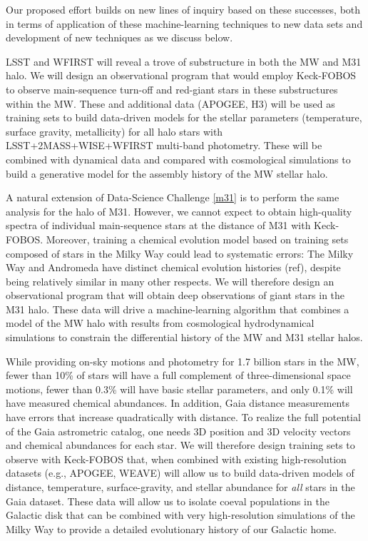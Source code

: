 \documentclass[oneside,11pt]{amsart}
\newcounter{chalno}
\newcommand{\chal}[1]{\refstepcounter{chalno}\label{#1}}
\begin{document}
Our proposed effort builds on new lines of inquiry based on these
successes, both in terms of application of these machine-learning
techniques to new data sets and development of new techniques as we
discuss below.

\medskip \chal{mwhalo}  LSST and WFIRST will reveal a trove of substructure in
both the MW and M31 halo.  We will design an observational program that
would employ Keck-FOBOS to observe main-sequence turn-off and red-giant
stars in these substructures within the MW.  These and additional data
(APOGEE, H3) will be used as training sets to build data-driven models
for the stellar parameters (temperature, surface gravity, metallicity)
for all halo stars with LSST+2MASS+WISE+WFIRST multi-band photometry.
These will be combined with dynamical data and compared with
cosmological simulations to build a generative model for the assembly
history of the MW stellar halo.

\medskip \chal{m31}   A natural extension of
Data-Science Challenge \ref{m31} is to perform the same analysis for the
halo of M31.  However, we cannot expect to obtain high-quality spectra
of individual main-sequence stars at the distance of M31 with
Keck-FOBOS.  Moreover, training a chemical evolution model based on
training sets composed of stars in the Milky Way could lead to
systematic errors:  The Milky Way and Andromeda have distinct chemical
evolution histories (ref), despite being relatively similar in many
other respects.  We will therefore design an observational program that
will obtain deep observations of giant stars in the M31 halo.  These
data will drive a machine-learning algorithm that combines a model of
the MW halo with results from cosmological hydrodynamical simulations to
constrain the differential history of the MW and M31 stellar halos.

\medskip \chal{gaia}  While
providing on-sky motions and photometry for 1.7 billion stars in the MW,
fewer than 10\% of stars will have a full complement of
three-dimensional space motions, fewer than 0.3\% will have basic
stellar parameters, and only 0.1\% will have measured chemical
abundances.  In addition, Gaia distance measurements have errors that
increase quadratically with distance.  To realize the full potential of
the Gaia astrometric catalog, one needs 3D position and 3D velocity
vectors and chemical abundances for each star.  We will therefore design
training sets to observe with Keck-FOBOS that, when combined with
existing high-resolution datasets (e.g., APOGEE, WEAVE) will allow us to
build data-driven models of distance, temperature, surface-gravity, and
stellar abundance for {\it all} stars in the Gaia dataset.  These data
will allow us to isolate coeval populations in the Galactic disk that
can be combined with very high-resolution simulations of the Milky Way
to provide a detailed evolutionary history of our Galactic home.
\end{document}
